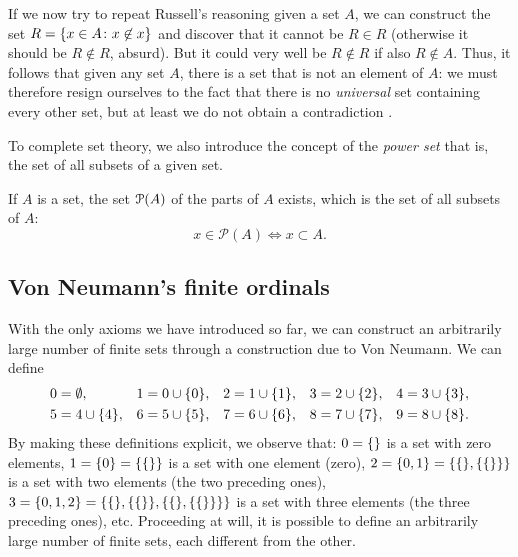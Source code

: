 If we now try to repeat Russell's reasoning given a set $A$, we can construct
the set $R=\ENCLOSE{x\in A\colon x\not \in x}$ and discover that it cannot be
$R\in R$ (otherwise it should be $R\not \in R$, absurd). But it could very well
be $R\not \in R$ if also $R\not \in A$. Thus, it follows that given any set $A$,
there is a set that is not an element of $A$: we must therefore resign ourselves
to the fact that there is no \emph{universal} set containing every other set,
but at least we do not obtain a contradiction%
.

To complete set theory, we also introduce the concept of the \emph{power set}%
%
% 
that is, the set of all subsets of a given set.
\begin{axiom}
\label{def:insieme_parti}%
If $A$ is a set, the set $\P(A)$ of the parts of $A$ exists, which is the set of
all subsets of $A$:
\begin{equation}\label{eq:insieme_delle_parti}
  x \in \mathcal P(A) \iff x \subset A.
\end{equation}
\end{axiom}

\subsection{Von Neumann's finite ordinals}

With the only axioms we have introduced so far, we can construct an arbitrarily
large number of finite sets through a construction due to Von Neumann. We can
define
\begin{equation}\label{eq:vonNeumann}
  \begin{aligned}
  0&=\emptyset, &
  1&=0\cup\ENCLOSE{0}, &
  2&=1\cup\ENCLOSE{1}, &
  3&=2\cup\ENCLOSE{2}, &
  4&=3\cup\ENCLOSE{3},\\
  5&=4\cup\ENCLOSE{4}, &
  6&=5\cup\ENCLOSE{5}, &
  7&=6\cup\ENCLOSE{6}, &
  8&=7\cup\ENCLOSE{7}, &
  9&=8\cup\ENCLOSE{8}.
  \end{aligned}
\end{equation}
By making these definitions explicit, we observe that:
$0=\ENCLOSE{}$ is a set with zero elements, 
$1=\ENCLOSE{0}=\ENCLOSE{\ENCLOSE{}}$ is a set with one element (zero),
$2=\ENCLOSE{0,1}=\ENCLOSE{\ENCLOSE{},\ENCLOSE{\ENCLOSE{}}}$ is a set with two
elements (the two preceding ones),
$3=\ENCLOSE{0,1,2}=\ENCLOSE{\ENCLOSE{},\ENCLOSE{\ENCLOSE{}},\ENCLOSE{\ENCLOSE{},\ENCLOSE{\ENCLOSE{}}}}$
is a set with three elements (the three preceding ones),
etc.
Proceeding at will, it is possible to define an arbitrarily large number of
finite sets, each different from the other.

